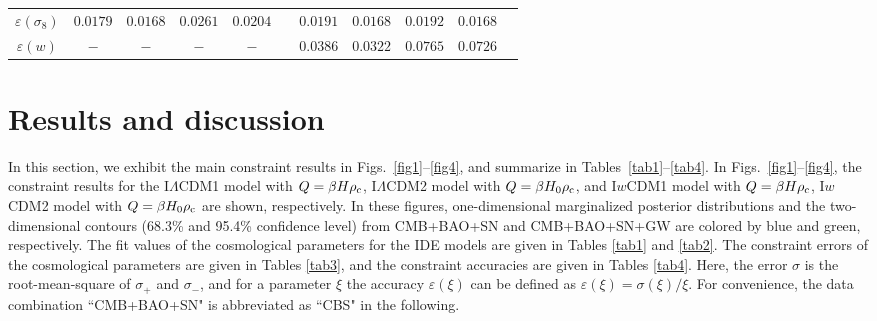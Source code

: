 \documentclass[aps,prd,nofootinbib,amsmath,amssymb,superscriptaddress,twocolumn,10pt]{revtex4}%
\begin{document}
\begin{table}
\begin{tabular}{ccccccccccc}
$\varepsilon(\sigma_{8})$                             &$0.0179$
                                         &$0.0168$
                                         &$0.0261$
                                         &$0.0204$
                                         &&$0.0191$
                                         &$0.0168$
                                         &$0.0192$
                                         &$0.0168$\\

$\varepsilon(w)$                                      &$-$
                                         &$-$
                                         &$-$
                                         &$-$
                                         &&$0.0386$
                                         &$0.0322$
                                         &$0.0765$
                                         &$0.0726$\\


\hline
\end{tabular}

\end{table}


\section{Results and discussion}\label{sec4}

In this section, we exhibit the main constraint results in Figs.~\ref{fig1}--\ref{fig4}, and summarize in Tables~\ref{tab1}--\ref{tab4}. In Figs.~\ref{fig1}--\ref{fig4}, the constraint results for the I$\Lambda$CDM1 model with $Q=\beta H\rho_{\rm c}$, I$\Lambda$CDM2 model with $Q=\beta H_{0}\rho_{\rm c}$, and I$w$CDM1 model with $Q=\beta H\rho_{\rm c}$, I$w$CDM2 model with $Q=\beta H_{0}\rho_{\rm c}$ are shown, respectively. In these figures, one-dimensional marginalized posterior distributions and the two-dimensional contours (68.3\% and 95.4\% confidence level) from CMB+BAO+SN and CMB+BAO+SN+GW are colored by blue and green, respectively. The fit values of the cosmological parameters for the IDE models are given in Tables \ref{tab1} and \ref{tab2}. The constraint errors of the cosmological parameters are given in Tables \ref{tab3}, and the constraint accuracies are given in Tables \ref{tab4}. Here, the error $\sigma$ is the root-mean-square of $\sigma_+$ and $\sigma_-$, and for a parameter $\xi$ the accuracy $\varepsilon(\xi)$ can be defined as $\varepsilon(\xi)=\sigma(\xi)/\xi$. For convenience, the data combination ``CMB+BAO+SN" is abbreviated as ``CBS" in the following.
\end{document}
